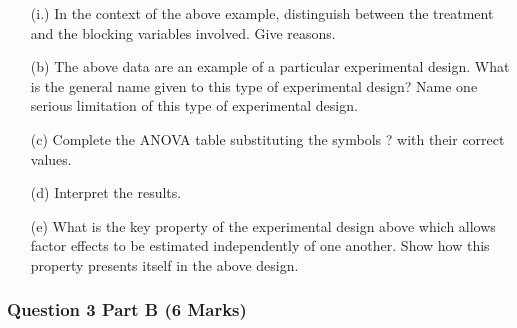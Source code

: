 \documentclass[a4paper,12pt]{article}
\begin{document}
\begin{itemize}
	\item[(i.)] In the context of the above example, distinguish between the treatment and the blocking variables involved. Give reasons.
	
	
	\item[(b)] The above data are an example of a particular experimental design. What is the general name given to this type of experimental design? Name one serious limitation of this type of experimental design.
	
	
	\item[(c)] Complete the ANOVA table substituting the symbols ? with their correct values.
	
	
	\item[(d)] Interpret the results.
	
	
	\item[(e)] What is the key property of the experimental design above which allows factor effects to be estimated independently of one another. Show how this property presents itself in the above design.
	
	
\end{itemize}
\newpage
\subsubsection*{Question 3 Part B (6 Marks)}
\end{document}
